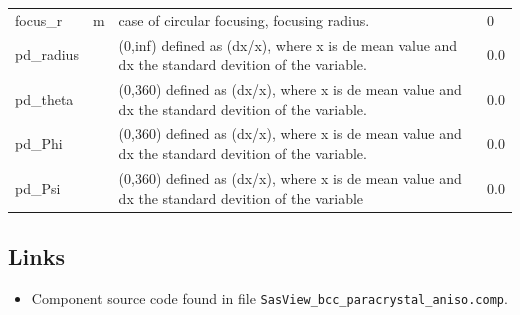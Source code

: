 \begin{longtable}{p{}p{}p{}p{}}
focus\_r & m & case of circular focusing, focusing radius. & 0 \\
pd\_radius &  & (0,inf) defined as (dx/x), where x is de mean value and dx the standard devition of the variable. & 0.0 \\
pd\_theta &  & (0,360) defined as (dx/x), where x is de mean value and dx the standard devition of the variable. & 0.0 \\
pd\_Phi &  & (0,360) defined as (dx/x), where x is de mean value and dx the standard devition of the variable. & 0.0 \\
pd\_Psi &  & (0,360) defined as (dx/x), where x is de mean value and dx the standard devition of the variable & 0.0 \\
\bottomrule
\end{longtable}

\subsection*{Links}
\begin{itemize}
  \item Component source code found in file \texttt{SasView\_bcc\_paracrystal\_aniso.comp}.
\end{itemize}
